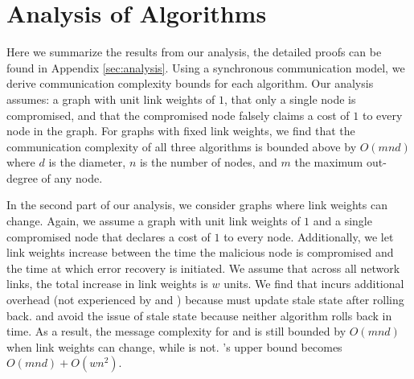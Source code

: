 
\section{Analysis of Algorithms}
\label{sec:analysis-summary}

Here we summarize the results from our analysis, the detailed proofs can be found in Appendix \ref{sec:analysis}.
Using a synchronous communication model, we derive communication complexity bounds for each algorithm.  Our analysis assumes: a graph with unit link weights of $1$,
that only a single node is compromised, and that the compromised node
falsely claims a cost of $1$ to every node in the graph. 
For graphs with fixed link weights, we find that the communication complexity of all three algorithms is bounded above by $O(mnd)$  where $d$ is the diameter, $n$ is the number of nodes, and $m$ the maximum out-degree of any node.

In the second part of our analysis, we consider graphs where link weights can change. Again, we assume a graph with unit link weights of $1$ and a single compromised node that declares a cost of $1$ to every node.
Additionally, we let link weights increase between the time the malicious node is compromised and the time at which error recovery is initiated.  
We assume that across all network links, the total increase in link weights is $w$ units.
We find that \cpr incurs additional overhead (not experienced by \second and \purges) because \cpr must update stale state after rolling back. 
\second and \purge avoid the issue of stale state because neither algorithm rolls back in time.  As a result, the message complexity for \second and \purge is still bounded by
$O(mnd)$ when link weights can change, while \cpr is not. \cprs's upper bound becomes $O(mnd) + O(wn^2)$. 



